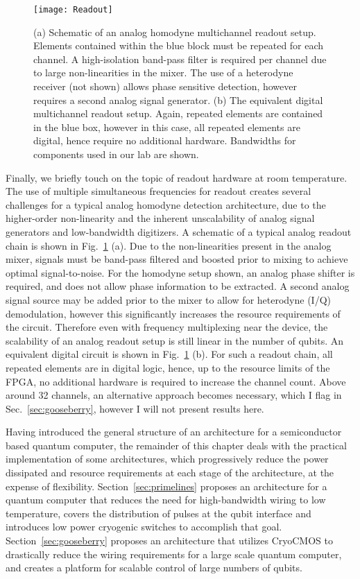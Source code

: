 \begin{figure}
  \texttt{[image: Readout]}
  \caption[Comparison of analog and digital multichannel readout]
  {\label{fig:multiread}(a) Schematic of an analog homodyne multichannel readout setup. Elements contained within the blue block must be repeated for each channel.
  A high-isolation band-pass filter is required per channel due to large non-linearities in the mixer. The use of a heterodyne receiver (not shown) allows phase
  sensitive detection, however requires a second analog signal generator. (b) The equivalent digital multichannel readout setup. Again, repeated elements are contained
  in the blue box, however in this case, all repeated elements are digital, hence require no additional hardware. Bandwidths for components used in our lab are shown.}
\end{figure}

Finally, we briefly touch on the topic of readout hardware at room temperature. The use of multiple simultaneous frequencies for readout creates several challenges
for a typical analog homodyne detection architecture, due to the higher-order non-linearity and the inherent unscalability of analog signal generators and low-bandwidth
digitizers. A schematic of a typical analog readout chain is shown in Fig.~\ref{fig:multiread} (a). Due to the non-linearities present in the analog mixer, signals must be
band-pass filtered and boosted prior to mixing to achieve optimal signal-to-noise. For the homodyne setup shown, an analog phase shifter is required, and does not allow
phase information to be extracted. A second analog signal source may be added prior to the mixer to allow for heterodyne (I/Q) demodulation, however this significantly
increases the resource requirements of the circuit. Therefore even with frequency multiplexing near the device, the scalability of an analog readout setup is still
linear in the number of qubits. An equivalent digital circuit is shown in Fig.~\ref{fig:multiread} (b). For such a readout chain, all repeated elements are in digital logic,
hence, up to the resource limits of the FPGA, no additional hardware is required to increase the channel count. Above around 32 channels, an alternative approach becomes
necessary, which I flag in Sec.~\ref{sec:gooseberry}, however I will not present results here.

Having introduced the general structure of an architecture for a semiconductor based quantum computer, the remainder of this chapter deals with the practical implementation
of some architectures, which progressively reduce the power dissipated and resource requirements at each stage of the architecture, at the expense of flexibility.
Section~\ref{sec:primelines} proposes an architecture for a quantum computer that reduces the need for high-bandwidth wiring to low temperature, covers the distribution of pulses
at the qubit interface and introduces low power cryogenic switches to accomplish that goal. Section~\ref{sec:gooseberry} proposes an architecture that utilizes CryoCMOS to drastically
reduce the wiring requirements for a large scale quantum computer, and creates a platform for scalable control of large numbers of qubits.

